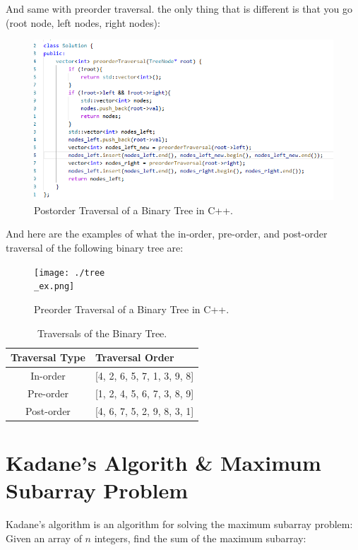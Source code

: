 \documentclass[12pt]{article}
\begin{document}
And same with preorder traversal. the only thing that is different is that you go (root node, left nodes, right nodes):
\begin{figure}[H]
    \centering
    \includegraphics[width=1.0\textwidth]{./preorder.png} %
	\caption{Postorder Traversal of a Binary Tree in C++.}
\end{figure}
And here are the examples of what the in-order, pre-order, and post-order traversal of the following binary tree are:

\begin{figure}[H]
    \centering
    \texttt{[image: ./tree\\\_ex.png]} %
	\caption{Preorder Traversal of a Binary Tree in C++.}
\end{figure}
\begin{table}[H]
\centering
\begin{tabular}{|c|l|}
\hline
\textbf{Traversal Type} & \textbf{Traversal Order}                       \\ \hline
In-order                & [4, 2, 6, 5, 7, 1, 3, 9, 8]                   \\ \hline
Pre-order               & [1, 2, 4, 5, 6, 7, 3, 8, 9]                   \\ \hline
Post-order              & [4, 6, 7, 5, 2, 9, 8, 3, 1]                   \\ \hline
\end{tabular}
\caption{Traversals of the Binary Tree.}
\end{table}
\section{Kadane's Algorith \& Maximum Subarray Problem}
Kadane's algorithm is an algorithm for solving the maximum subarray problem: Given an array of \(n\) integers, find the sum of the maximum subarray:
\end{document}
